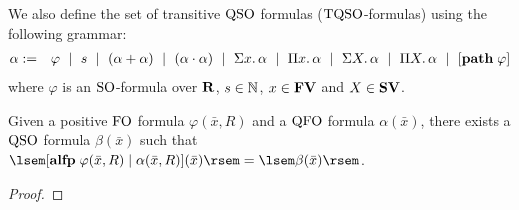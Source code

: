 We also define the set of transitive ${\rm QSO}$ formulas (${\rm TQSO}$-formulas) using the following grammar:
\begin{eqnarray*}
	\label{eq-def-tqso}	\alpha & := & \varphi \ \mid \ s \ \mid \ (\alpha + \alpha) \ \mid\ (\alpha \cdot \alpha) \ \mid \ \Sigma{x}.\, \alpha \ \mid \ \Pi{x}.\, \alpha \ \mid \ \Sigma{X}.\, \alpha \ \mid \ \Pi{X}.\, \alpha \ \mid \ [{\bf path} \; \varphi]
\end{eqnarray*}
where $\varphi$ is an ${\rm SO}$-formula over $\mathbf{R}$, $s \in \mathbb{N}$, $x \in \mathbf{FV}$ and $X \in \mathbf{SV}$.
\begin{theorem}
	Given a positive ${\rm FO}$ formula $\varphi(\bar{x},R)$ and a ${\rm QFO}$ formula $\alpha(\bar{x})$, there exists a ${\rm QSO}$ formula $\beta(\bar{x})$ such that $\sem{[\alfp\varphi(\bar{x},R)\mid \alpha(\bar{x},R)](\bar{x})} = \sem{\beta(\bar{x})}$.
\end{theorem}
\begin{proof}
	
\end{proof}
